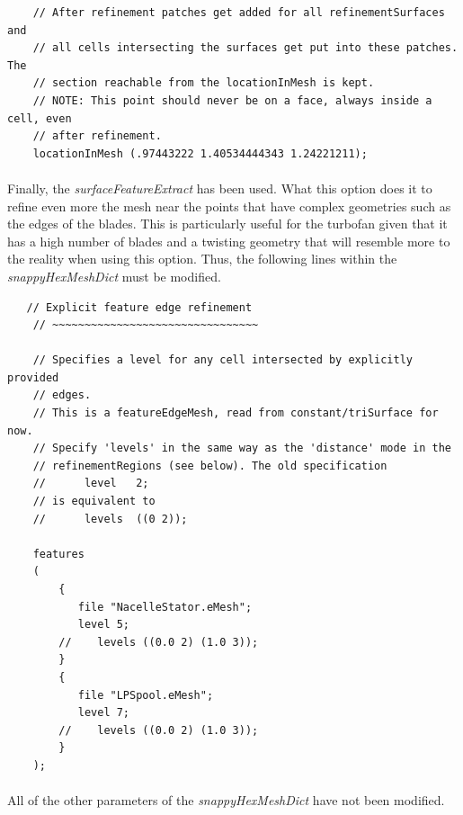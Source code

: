 \begin{footnotesize}
\begin{verbatim}
    // After refinement patches get added for all refinementSurfaces and
    // all cells intersecting the surfaces get put into these patches. The
    // section reachable from the locationInMesh is kept.
    // NOTE: This point should never be on a face, always inside a cell, even
    // after refinement.
    locationInMesh (.97443222 1.40534444343 1.24221211);
\end{verbatim}
\end{footnotesize}

\paragraph{}Finally, the \textit{surfaceFeatureExtract} has been used.  What this option does it to refine even more the mesh near the points that have complex geometries such as the edges of the blades. This is particularly useful for the turbofan given that it has a high number of blades and a twisting geometry that will resemble more to the reality when using this option. Thus, the following lines within the \textit{snappyHexMeshDict} must be modified.

\begin{footnotesize}
\begin{verbatim}
   // Explicit feature edge refinement
    // ~~~~~~~~~~~~~~~~~~~~~~~~~~~~~~~~

    // Specifies a level for any cell intersected by explicitly provided
    // edges.
    // This is a featureEdgeMesh, read from constant/triSurface for now.
    // Specify 'levels' in the same way as the 'distance' mode in the
    // refinementRegions (see below). The old specification
    //      level   2;
    // is equivalent to
    //      levels  ((0 2));

    features
    (
        {
           file "NacelleStator.eMesh";
           level 5;
        //    levels ((0.0 2) (1.0 3));
        }
        {
           file "LPSpool.eMesh";
           level 7;
        //    levels ((0.0 2) (1.0 3));
        }
    );
\end{verbatim}
\end{footnotesize}

\paragraph{}All of the other parameters of the \textit{snappyHexMeshDict} have not been modified.

